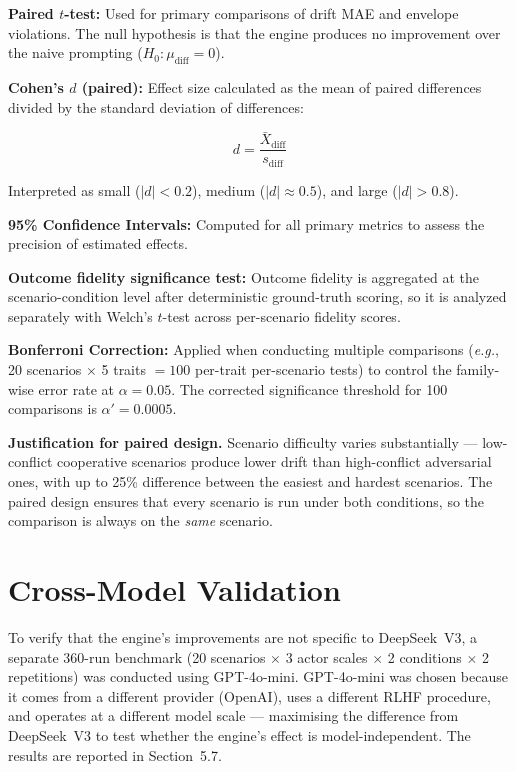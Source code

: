 \documentclass[12pt, a4paper]{report}
\newcommand{\eg}{\textit{e.g.}}
\begin{document}
\textbf{Paired $t$-test:} Used for primary comparisons of drift MAE and envelope violations. The null hypothesis is that the engine produces no improvement over the naive prompting ($H_0\colon \mu_{\text{diff}} = 0$).

\textbf{Cohen's $d$ (paired):} Effect size calculated as the mean of paired differences divided by the standard deviation of differences:

\begin{equation}
    d = \frac{\bar{X}_{\text{diff}}}{s_{\text{diff}}}
    \label{eq:cohens_d}
\end{equation}

Interpreted as small ($|d| < 0.2$), medium ($|d| \approx 0.5$), and large ($|d| > 0.8$).

\textbf{95\% Confidence Intervals:} Computed for all primary metrics to assess the precision of estimated effects.

\textbf{Outcome fidelity significance test:} Outcome fidelity is aggregated at the scenario-condition level after deterministic ground-truth scoring, so it is analyzed separately with Welch's $t$-test across per-scenario fidelity scores.

\textbf{Bonferroni Correction:} Applied when conducting multiple comparisons (\eg, 20 scenarios $\times$ 5 traits $= 100$ per-trait per-scenario tests) to control the family-wise error rate at $\alpha = 0.05$. The corrected significance threshold for 100 comparisons is $\alpha' = 0.0005$.

\textbf{Justification for paired design.} Scenario difficulty varies substantially --- low-conflict cooperative scenarios produce lower drift than high-conflict adversarial ones, with up to 25\% difference between the easiest and hardest scenarios. The paired design ensures that every scenario is run under both conditions, so the comparison is always on the \textit{same} scenario.


\section{Cross-Model Validation}

To verify that the engine's improvements are not specific to DeepSeek~V3, a separate 360-run benchmark (20 scenarios $\times$ 3 actor scales $\times$ 2 conditions $\times$ 2 repetitions) was conducted using GPT-4o-mini. GPT-4o-mini was chosen because it comes from a different provider (OpenAI), uses a different RLHF procedure, and operates at a different model scale --- maximising the difference from DeepSeek~V3 to test whether the engine's effect is model-independent. The results are reported in Section~5.7.
\end{document}
